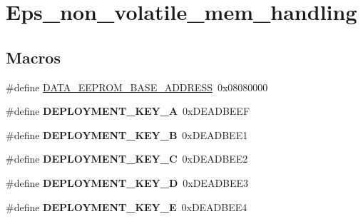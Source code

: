 \hypertarget{group__eps__non__volatile__mem__handling}{\section{Eps\-\_\-non\-\_\-volatile\-\_\-mem\-\_\-handling}
\label{group__eps__non__volatile__mem__handling}
}
\subsection*{Macros}
\begin{DoxyCompactItemize}
\item 
\#define \hyperlink{group__eps__non__volatile__mem__handling_gaae76a8f2af728d5113e2cee5f525642c}{D\-A\-T\-A\-\_\-\-E\-E\-P\-R\-O\-M\-\_\-\-B\-A\-S\-E\-\_\-\-A\-D\-D\-R\-E\-S\-S}~0x08080000
\item 
\hypertarget{group__eps__non__volatile__mem__handling_gad5704c0515d45f4513b8f6b25a933bfe}{\#define {\bfseries D\-E\-P\-L\-O\-Y\-M\-E\-N\-T\-\_\-\-K\-E\-Y\-\_\-\-A}~0x\-D\-E\-A\-D\-B\-E\-E\-F}\label{group__eps__non__volatile__mem__handling_gad5704c0515d45f4513b8f6b25a933bfe}

\item 
\hypertarget{group__eps__non__volatile__mem__handling_ga7c0dc8d854cf6b99f2390a584fce6eb0}{\#define {\bfseries D\-E\-P\-L\-O\-Y\-M\-E\-N\-T\-\_\-\-K\-E\-Y\-\_\-\-B}~0x\-D\-E\-A\-D\-B\-E\-E1}\label{group__eps__non__volatile__mem__handling_ga7c0dc8d854cf6b99f2390a584fce6eb0}

\item 
\hypertarget{group__eps__non__volatile__mem__handling_ga1d0ae86fd72bc87f9bd1283fa46306e6}{\#define {\bfseries D\-E\-P\-L\-O\-Y\-M\-E\-N\-T\-\_\-\-K\-E\-Y\-\_\-\-C}~0x\-D\-E\-A\-D\-B\-E\-E2}\label{group__eps__non__volatile__mem__handling_ga1d0ae86fd72bc87f9bd1283fa46306e6}

\item 
\hypertarget{group__eps__non__volatile__mem__handling_gac0df1a9949be4a663f92665a6988fd34}{\#define {\bfseries D\-E\-P\-L\-O\-Y\-M\-E\-N\-T\-\_\-\-K\-E\-Y\-\_\-\-D}~0x\-D\-E\-A\-D\-B\-E\-E3}\label{group__eps__non__volatile__mem__handling_gac0df1a9949be4a663f92665a6988fd34}

\item 
\hypertarget{group__eps__non__volatile__mem__handling_ga8786d04ef7d063cf958568f081178a86}{\#define {\bfseries D\-E\-P\-L\-O\-Y\-M\-E\-N\-T\-\_\-\-K\-E\-Y\-\_\-\-E}~0x\-D\-E\-A\-D\-B\-E\-E4}\label{group__eps__non__volatile__mem__handling_ga8786d04ef7d063cf958568f081178a86}


\end{DoxyCompactItemize}

